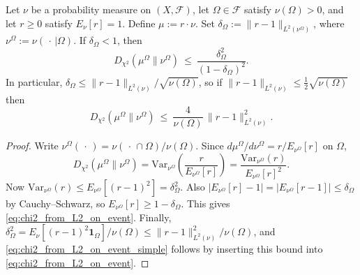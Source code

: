 \begin{lemma}\label{lem:chi2_from_L2_on_event}
Let $\nu$ be a probability measure on $(X,\mathcal F)$, let $\Omega\in\mathcal F$ satisfy $\nu(\Omega)>0$, and let $r\ge 0$ satisfy $E_{\nu}[r]=1$.
Define $\mu:=r\cdot\nu$.
Set $\delta_{\Omega}:=\|r-1\|_{L^2(\nu^{\Omega})}$, where $\nu^{\Omega}:=\nu(\,\cdot\,|\Omega)$.
If $\delta_{\Omega}<1$, then
\begin{equation}\label{eq:chi2_from_L2_on_event}
D_{\chi^2}(\mu^{\Omega}\|\nu^{\Omega})
\ \le\
\frac{\delta_{\Omega}^2}{(1-\delta_{\Omega})^2}.
\end{equation}
In particular, $\delta_{\Omega}\le \|r-1\|_{L^2(\nu)}/\sqrt{\nu(\Omega)}$, so if $\|r-1\|_{L^2(\nu)}\le \frac12\sqrt{\nu(\Omega)}$ then
\begin{equation}\label{eq:chi2_from_L2_on_event_simple}
D_{\chi^2}(\mu^{\Omega}\|\nu^{\Omega})
\ \le\
\frac{4}{\nu(\Omega)}\,\|r-1\|_{L^2(\nu)}^2.
\end{equation}
\end{lemma}

\begin{proof}
Write $\nu^{\Omega}(\,\cdot\,)=\nu(\,\cdot\,\cap\Omega)/\nu(\Omega)$.
Since $d\mu^{\Omega}/d\nu^{\Omega}=r/E_{\nu^{\Omega}}[r]$ on $\Omega$,
\[
D_{\chi^2}(\mu^{\Omega}\|\nu^{\Omega})
=\mathrm{Var}_{\nu^{\Omega}}\!\left(\frac{r}{E_{\nu^{\Omega}}[r]}\right)
=\frac{\mathrm{Var}_{\nu^{\Omega}}(r)}{E_{\nu^{\Omega}}[r]^2}.
\]
Now $\mathrm{Var}_{\nu^{\Omega}}(r)\le E_{\nu^{\Omega}}[(r-1)^2]=\delta_{\Omega}^2$.
Also $|E_{\nu^{\Omega}}[r]-1|=|E_{\nu^{\Omega}}[r-1]|\le \delta_{\Omega}$ by Cauchy--Schwarz,
so $E_{\nu^{\Omega}}[r]\ge 1-\delta_{\Omega}$.
This gives \eqref{eq:chi2_from_L2_on_event}.
Finally, $\delta_{\Omega}^2=E_{\nu}[(r-1)^2\mathbf 1_{\Omega}]/\nu(\Omega)\le \|r-1\|_{L^2(\nu)}^2/\nu(\Omega)$,
and \eqref{eq:chi2_from_L2_on_event_simple} follows by inserting this bound into \eqref{eq:chi2_from_L2_on_event}.
\end{proof}

